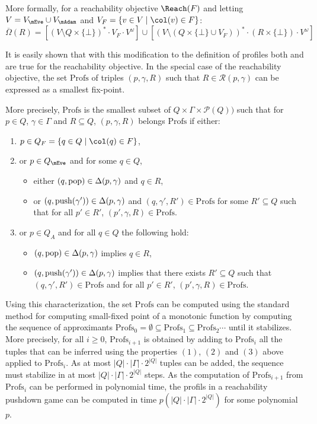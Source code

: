 More formally, for a reachability objective $\Reach(F)$ and letting $V=V_\mEve\cup V_\mAdam$ and $V_F = \{ v \in V \mid \pdscol{v} \in F\}$:
\[ \overline{\Omega}(R) = [(V \setminus Q \times \{\bot\})^* \cdot V_F \cdot V^\omega]\cup [(V \setminus (Q\times\{\bot\} \cup V_F))^* \cdot (R\times \{\bot\}) \cdot V^\omega]
\]

It is easily shown that with this modification to the definition of profiles both  and  are true for the reachability objective.
\newcommand{\Profs}{\mathrm{Profs}}
In the special case of the reachability objective, the set $\Profs$ of triples $(p,\gamma,R)$ such that $R \in \mathcal{R}(p,\gamma)$ can be expressed as a smallest fix-point.

More precisely, $\Profs$ is the smallest subset of $Q\times \Gamma \times \mathcal{P}(Q))$ such that for $p \in Q$, $\gamma \in \Gamma$ and $R \subseteq Q$, $(p,\gamma,R)$ belongs $\Profs$ if either: 
\begin{enumerate}
\item $p \in Q_F=\{ q \in Q \mid \pdscol{q} \in F\}$,
\item or $p \in Q_{\mEve}$ and for some $q \in Q$,
\begin{itemize}
\item either $(q,\mathrm{pop}) \in \Delta(p,\gamma)$ and $q \in R$,
\item or $(q,\mathrm{push}(\gamma')) \in \Delta(p,\gamma)$  and $(q,\gamma',R') \in \Profs$ for some $R' \subseteq Q$ such that for all $p' \in R'$, $(p',\gamma,R) \in \Profs$.
\end{itemize}
\item or $p \in Q_A$ and for all $q \in Q$ the following hold: 
\begin{itemize}
\item $(q,\mathrm{pop}) \in \Delta(p,\gamma)$ implies $q \in R$,
\item  $(q,\mathrm{push}(\gamma')) \in \Delta(p,\gamma)$ implies that there exists $R' \subseteq Q$ such that $(q,\gamma',R') \in \Profs$ and for all $p' \in R'$, $(p',\gamma,R) \in \Profs$. 
\end{itemize}
\end{enumerate}


Using this characterization, the set $\Profs$ can be computed using the standard method for computing small-fixed point of a monotonic function by computing the sequence of approximants $\Profs_0 = \emptyset \subseteq \Profs_1 \subseteq \Profs_2 \cdots$ until it stabilizes. More precisely, for all $i \geq 0$, $\Profs_{i+1}$ is obtained by adding to $\Profs_{i}$ all the tuples that can be inferred using the properties $(1)$, $(2)$ and $(3)$ above applied to $\Profs_i$. As at most $|Q|\cdot |\Gamma|\cdot 2^{|Q|}$ tuples can be added, the sequence must stabilize in at most $|Q| \cdot |\Gamma| \cdot 2^{|Q|}$ steps. As the computation of $\Profs_{i+1}$ from $\Profs_i$ can be performed in polynomial time, the profils in a reachability pushdown game can be computed in time  $p(|Q| \cdot |\Gamma| \cdot 2^{|Q|})$ for some polynomial $p$.

